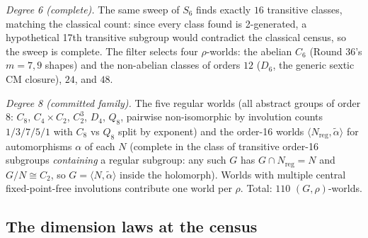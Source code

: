 \documentclass[11pt]{article}
\begin{document}
\emph{Degree 6 (complete).} The same sweep of $S_6$ finds exactly $16$
transitive classes, matching the classical count: since every class found
is 2-generated, a hypothetical 17th transitive subgroup would contradict
the classical census, so the sweep is complete. The filter selects four
$\rho$-worlds: the abelian $C_6$ (Round 36's $m=7,9$ shapes) and the
non-abelian classes of orders $12$ ($D_6$, the generic sextic CM closure),
$24$, and $48$.

\emph{Degree 8 (committed family).} The five regular worlds (all abstract
groups of order $8$: $C_8$, $C_4\times C_2$, $C_2^3$, $D_4$, $Q_8$,
pairwise non-isomorphic by involution counts $1/3/7/5/1$ with $C_8$ vs
$Q_8$ split by exponent) and the order-16 worlds
$\langle N_{\mathrm{reg}},\tilde\alpha\rangle$ for automorphisms
$\alpha$ of each $N$ (complete in the class of transitive order-16
subgroups \emph{containing} a regular subgroup: any such $G$ has
$G\cap N_{\mathrm{reg}}=N$ and $G/N\cong C_2$, so $G=\langle
N,\tilde\alpha\rangle$ inside the holomorph). Worlds with multiple central
fixed-point-free involutions contribute one world per $\rho$. Total:
$110$ $(G,\rho)$-worlds.

\subsection{The dimension laws at the census}
\end{document}
